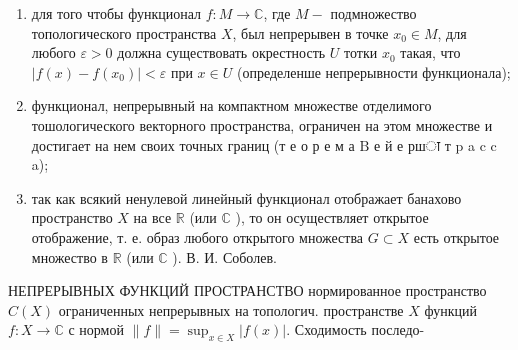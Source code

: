 \documentclass[10pt]{article}
\begin{document}
\begin{enumerate}

  \item для того чтобы функционал $f: M \rightarrow \mathbb{C}$, где $M-$ подмножество топологического пространства $X$, был непрерывен в точке $x_{0} \in M$, для любого $\varepsilon>0$ должна существовать окрестность $U$ тотки $x_{0}$ такая, что $\left|f(x)-f\left(x_{0}\right)\right|<\varepsilon$ при $x \in U$ (определенше непрерывности функционала);



  \item функционал, непрерывный на компактном множестве отделимого тошологического векторного пространства, ограничен на этом множестве и достигает на нем своих точных границ (т е о р е м а $\mathrm{B}$ е й е ршा т p a c c a);



  \item так как всякий ненулевой линейный функционал отображает банахово пространство $X$ на все $\mathbb{R}$ (или $\mathbb{C}$ ), то он осуществляет открытое отображение, т. е. образ любого открытого множества $G \subset X$ есть открытое множество в $\mathbb{R}$ (или $\mathbb{C}$ ). В. И. Соболев.



\end{enumerate}



НЕПРЕРЫВНЫХ ФУНКЦИЙ ПРОСТРАНСТВО нормированное пространство $C(X)$ ограниченных непрерывных на топологич. пространстве $X$ функций $f: X \rightarrow \mathbb{C}$ с нормой $\|f\|=\sup _{x \in X}|f(x)|$. Сходимость последо-
\end{document}
